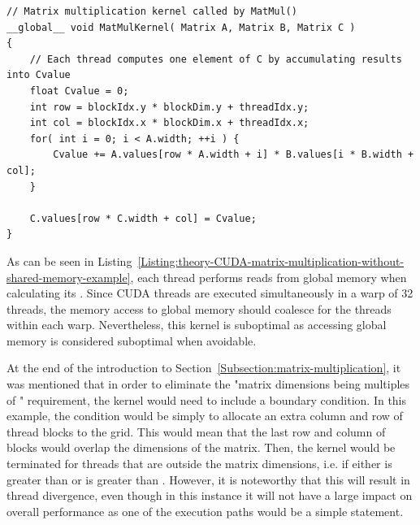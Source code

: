 \begin{lstlisting}[caption={Definition of the matrix multiplication kernel that uses global memory without shared memory. Each thread has a variable \code{Cvalue} stored in registers into which it calculates its specific \code{C(row, col)} matrix element. Taken from Nvidia's \emph{CUDA C++ Programming Guide} \cite{NVIDIAMay2022}.},label={Listing:theory-CUDA-matrix-multiplication-without-shared-memory-example}]
// Matrix multiplication kernel called by MatMul()
__global__ void MatMulKernel( Matrix A, Matrix B, Matrix C )
{
	// Each thread computes one element of C by accumulating results into Cvalue
	float Cvalue = 0;
	int row = blockIdx.y * blockDim.y + threadIdx.y;
	int col = blockIdx.x * blockDim.x + threadIdx.x;
	for( int i = 0; i < A.width; ++i ) {
		Cvalue += A.values[row * A.width + i] * B.values[i * B.width + col];
	}

	C.values[row * C.width + col] = Cvalue;
}
\end{lstlisting}

As can be seen in Listing~\ref{Listing:theory-CUDA-matrix-multiplication-without-shared-memory-example}, each thread performs  reads from global memory when calculating its . Since CUDA threads are executed simultaneously in a warp of 32 threads, the memory access to global memory should coalesce for the threads within each warp. Nevertheless, this kernel is suboptimal as accessing global memory is considered suboptimal when avoidable.
\par At the end of the introduction to Section~\ref{Subsection:matrix-multiplication}, it was mentioned that in order to eliminate the "matrix dimensions being multiples of " requirement, the kernel would need to include a boundary condition. In this example, the condition would be simply to allocate an extra column and row of thread blocks to the grid. This would mean that the last row and column of blocks would overlap the dimensions of the matrix. Then, the kernel would be terminated for threads that are outside the matrix dimensions, i.e. if either  is greater than  or  is greater than . However, it is noteworthy that this will result in thread divergence, even though in this instance it will not have a large impact on overall performance as one of the execution paths would be a simple  statement.

